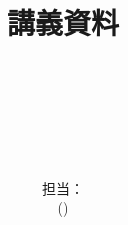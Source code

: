 \documentclass[a4paper,11pt]{jreport}
\title{講義資料 \\ \ \\ \LARGE  \bf \headertitlelonga \\ \ \\ \Huge \headertitlelongb}
\author{担当：\headerauthor \\ (\headerdepartment)}
\date{\headeryear}
\begin{document}
\maketitle

%
%
%
%
%
%
%
%
%
%
%

\renewcommand{\thepage}{\roman{page}}  %

\tableofcontents{-1cm}

\newpage  %

\setcounter{page}{1}  %
\renewcommand{\thepage}{\arabic{page}}  %





\appendix

%
\end{document}
